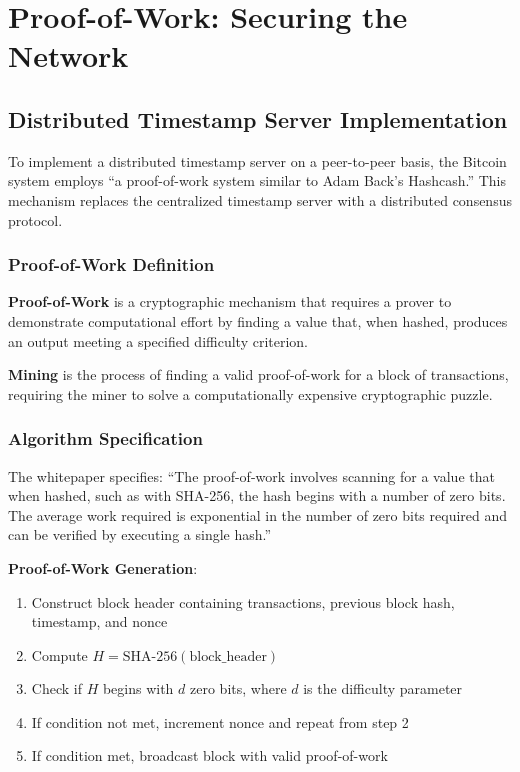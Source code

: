 
\section{Proof-of-Work: Securing the Network}
\label{sec:proof-of-work}

\subsection{Distributed Timestamp Server Implementation}
\label{subsec:distributed-timestamp}

To implement a distributed timestamp server on a peer-to-peer basis, the Bitcoin system employs ``a proof-of-work system similar to Adam Back's Hashcash.'' This mechanism replaces the centralized timestamp server with a distributed consensus protocol.

\subsubsection{Proof-of-Work Definition}

\textbf{Proof-of-Work} is a cryptographic mechanism that requires a prover to demonstrate computational effort by finding a value that, when hashed, produces an output meeting a specified difficulty criterion.

\textbf{Mining} is the process of finding a valid proof-of-work for a block of transactions, requiring the miner to solve a computationally expensive cryptographic puzzle.

\subsubsection{Algorithm Specification}

The whitepaper specifies: ``The proof-of-work involves scanning for a value that when hashed, such as with SHA-256, the hash begins with a number of zero bits. The average work required is exponential in the number of zero bits required and can be verified by executing a single hash.''

\textbf{Proof-of-Work Generation}:
\begin{enumerate}
  \item Construct block header containing transactions, previous block hash, timestamp, and nonce
  \item Compute $H = \text{SHA-256}(\text{block\_header})$
  \item Check if $H$ begins with $d$ zero bits, where $d$ is the difficulty parameter
  \item If condition not met, increment nonce and repeat from step 2
  \item If condition met, broadcast block with valid proof-of-work
\end{enumerate}

